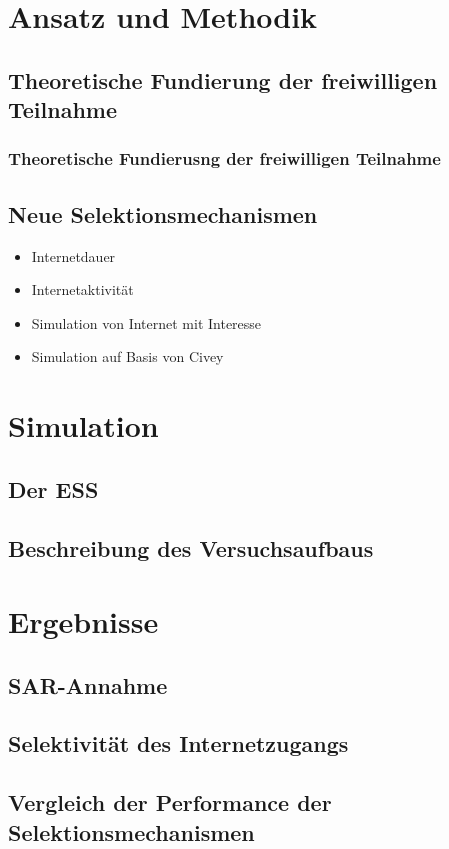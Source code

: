 \documentclass[a4paper , 11pt]{article}
\begin{document}
\section{Ansatz und Methodik}
\subsection{Theoretische Fundierung der freiwilligen Teilnahme }
\subsubsection{Theoretische Fundierusng der freiwilligen Teilnahme }
\subsection{Neue Selektionsmechanismen }
\begin{itemize}
\item Internetdauer
\item Internetaktivität
\item Simulation von Internet mit Interesse
\item Simulation auf Basis von Civey
\end{itemize}
\section{Simulation}
\subsection{Der ESS}
\subsection{Beschreibung des Versuchsaufbaus}

\section{Ergebnisse}
\subsection{SAR-Annahme}
\subsection{Selektivität des Internetzugangs}
\subsection{Vergleich der Performance der Selektionsmechanismen}
\end{document}
